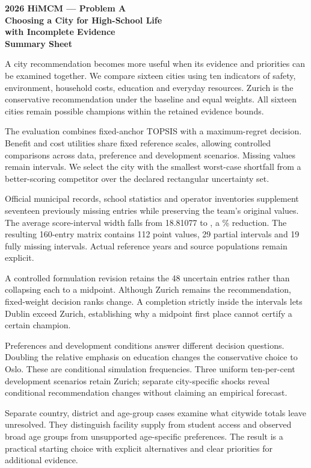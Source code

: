 \thispagestyle{fancy}
\begin{center}
\textbf{2026 HiMCM --- Problem A}\\[9pt]
{\Large\bfseries Choosing a City for High-School Life\\with Incomplete Evidence}\\[12pt]
\textbf{Summary Sheet}
\end{center}
A city recommendation becomes more useful when its evidence and priorities can
be examined together. We compare sixteen cities using ten indicators of safety,
environment, household costs, education and everyday resources. Zurich is the
conservative recommendation under the baseline and equal weights. All sixteen
cities remain possible champions within the retained evidence bounds.

The evaluation combines fixed-anchor TOPSIS with a maximum-regret decision.
Benefit and cost utilities share fixed reference scales, allowing controlled
comparisons across data, preference and development scenarios. Missing values
remain intervals. We select the city with the smallest worst-case shortfall from
a better-scoring competitor over the declared rectangular uncertainty set.

Official municipal records, school statistics and operator inventories supplement
seventeen previously missing entries while preserving the team's original values.
The average score-interval width falls from 18.81077 to \CurrentMeanWidth{}, a \TotalWidthReduction\%
reduction. The resulting 160-entry matrix contains 112 point values, 29 partial
intervals and 19 fully missing intervals. Actual reference years and source
populations remain explicit.

A controlled formulation revision retains the 48 uncertain entries rather
than collapsing each to a midpoint. Although Zurich remains the recommendation, \RevisionRankChanges{}
fixed-weight decision ranks change. A completion strictly inside the intervals
lets Dublin exceed Zurich, establishing why a midpoint first place cannot
certify a certain champion.

Preferences and development conditions answer different decision questions.
Doubling the relative emphasis on education changes the conservative choice to
Oslo. \SummaryWeightMC{} These are conditional simulation frequencies.
Three uniform ten-per-cent development scenarios retain Zurich; separate
city-specific shocks reveal conditional recommendation changes without claiming
an empirical forecast.

Separate country, district and age-group cases examine what citywide totals
leave unresolved. They distinguish facility supply from student access and
observed broad age groups from unsupported age-specific preferences. The result
is a practical starting choice with explicit alternatives and clear priorities
for additional evidence.

